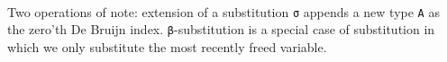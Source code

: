 \documentclass[authoryear, acmsmall, screen, review, nonacm]{acmart}
\begin{document}
\begin{code}[hide]
\AgdaSymbol{(}\AgdaSpace{}%
\AgdaSpace{}%
\AgdaSpace{}%
\AgdaOperator{\AgdaInductiveConstructor{\textasciitilde{}}}\AgdaSpace{}%
\AgdaSymbol{)}\AgdaSpace{}%
\AgdaSymbol{=}\AgdaSpace{}%
\AgdaSpace{}%
\AgdaSpace{}%
\AgdaSpace{}%
\AgdaSpace{}%
\AgdaSpace{}%
\AgdaSpace{}%
\AgdaSpace{}%
\AgdaOperator{\AgdaInductiveConstructor{\textasciitilde{}}}\AgdaSpace{}%
\AgdaSpace{}%
\AgdaSpace{}%
\<%
\\
\>[0]\AgdaSpace{}%
\AgdaSpace{}%
\AgdaSymbol{(}\AgdaSpace{}%
\AgdaSpace{}%
\AgdaSymbol{)}\AgdaSpace{}%
\AgdaSymbol{=}\AgdaSpace{}%
\AgdaSymbol{(}\AgdaSpace{}%
\AgdaSpace{}%
\AgdaSymbol{)}\AgdaSpace{}%
\AgdaSpace{}%
\AgdaSymbol{(}\AgdaSpace{}%
\AgdaSpace{}%
\AgdaSymbol{)}\<%
\end{code} 

Two operations of note: extension of a substitution \verb!σ! appends a new type \verb!A! as the zero'th De Bruijn index. \verb!β!-substitution is a special case of substitution in which we only substitute the most recently freed variable.
\end{document}
